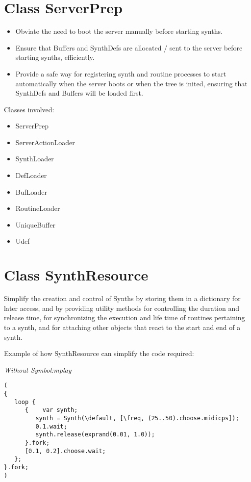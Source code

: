 \documentclass[11pt, a4paper]{scrartcl}
\begin{document}
\section*{Class ServerPrep}
\label{sec-14}


\begin{itemize}
\item Obviate the need to boot the server manually before starting synths.
\item Ensure that Buffers and SynthDefs are allocated / sent to the server
  before starting synths, efficiently.
\item Provide a safe way for registering synth and routine processes to start automatically when the server boots
  or when the tree is inited, ensuring that SynthDefs and Buffers will be loaded first.
\end{itemize}

Classes involved: 

\begin{itemize}
\item ServerPrep
\item ServerActionLoader
\item SynthLoader
\item DefLoader
\item BufLoader
\item RoutineLoader
\item UniqueBuffer
\item Udef
\end{itemize}
\section*{Class SynthResource}
\label{sec-15}


Simplify the creation and control of Synths by storing them in a dictionary for later access, and by providing utility methods for
controlling the duration and release time, for synchronizing the execution and life time of routines pertaining to a synth, and for attaching other objects that react to the start and end of a synth.

Example of how SynthResource can simplify the code required: 

\emph{Without Symbol:mplay}

\begin{verbatim}
(
{
   loop {
      {    var synth;
         synth = Synth(\default, [\freq, (25..50).choose.midicps]);
         0.1.wait;
         synth.release(exprand(0.01, 1.0));
      }.fork;
      [0.1, 0.2].choose.wait;
   };
}.fork;
)
\end{verbatim}
\end{document}
